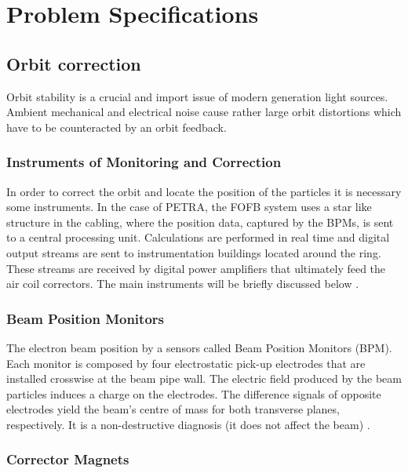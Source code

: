 \section{Problem Specifications}

\subsection{Orbit correction}

Orbit stability is a crucial and import issue of modern generation light sources. Ambient mechanical and electrical noise cause rather large orbit distortions which have to be counteracted by an orbit feedback.

\subsubsection{Instruments of Monitoring and Correction} 

In order to correct the orbit and locate the position of the particles it is necessary some instruments. In the case of PETRA, the FOFB system uses a star like structure in the cabling, where the position data, captured by the BPMs, is sent to a central processing unit. Calculations are performed in real time and digital output streams are sent to instrumentation buildings located around the ring. These streams are received by digital power amplifiers that ultimately feed the  air coil correctors. The main instruments will be briefly discussed below \cite{klute2011petra}.

\subsubsection*{Beam Position Monitors} 

The electron beam position by a sensors called Beam Position Monitors (BPM). Each monitor is composed by four electrostatic pick-up electrodes that are installed crosswise at the beam pipe wall. The electric field produced by the beam particles induces a charge on the electrodes. The difference signals of opposite electrodes yield the beam's centre of mass for both transverse planes, respectively. It is a non-destructive diagnosis (it does not affect the beam) \cite{forck2009beam} \cite{gaupp1988beam}.

\subsubsection*{Corrector Magnets}


